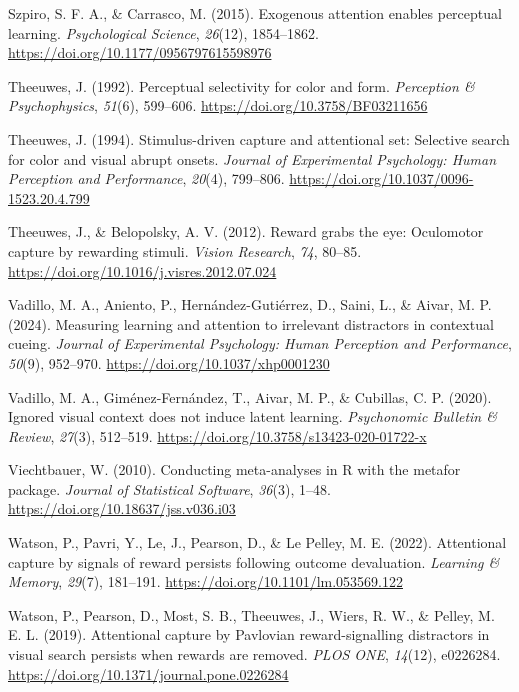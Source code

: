 \documentclass[
  man,
  floatsintext,
  longtable,
  nolmodern,
  notxfonts,
  notimes,
  mask,
  colorlinks=true,linkcolor=blue,citecolor=blue,urlcolor=blue]{apa7}
\newlength{\cslhangindent}
\newenvironment{CSLReferences}[2] %
 {\begin{list}{}{%
  \setlength{\itemindent}{0pt}
  \setlength{\leftmargin}{0pt}
  \setlength{\parsep}{0pt}
  \ifodd #1
   \setlength{\leftmargin}{\cslhangindent}
   \setlength{\itemindent}{-1\cslhangindent}
  \fi
  \setlength{\itemsep}{#2\baselineskip}}}
 {\end{list}}
\begin{document}
\begin{CSLReferences}{1}{0}
Szpiro, S. F. A., \& Carrasco, M. (2015). Exogenous attention enables
perceptual learning. \emph{Psychological Science}, \emph{26}(12),
1854--1862. \url{https://doi.org/10.1177/0956797615598976}

Theeuwes, J. (1992). Perceptual selectivity for color and form.
\emph{Perception \& Psychophysics}, \emph{51}(6), 599--606.
\url{https://doi.org/10.3758/BF03211656}

Theeuwes, J. (1994). Stimulus-driven capture and attentional set:
Selective search for color and visual abrupt onsets. \emph{Journal of
Experimental Psychology: Human Perception and Performance},
\emph{20}(4), 799--806. \url{https://doi.org/10.1037/0096-1523.20.4.799}

Theeuwes, J., \& Belopolsky, A. V. (2012). Reward grabs the eye:
Oculomotor capture by rewarding stimuli. \emph{Vision Research},
\emph{74}, 80--85. \url{https://doi.org/10.1016/j.visres.2012.07.024}

Vadillo, M. A., Aniento, P., Hernández-Gutiérrez, D., Saini, L., \&
Aivar, M. P. (2024). Measuring learning and attention to irrelevant
distractors in contextual cueing. \emph{Journal of Experimental
Psychology: Human Perception and Performance}, \emph{50}(9), 952--970.
\url{https://doi.org/10.1037/xhp0001230}

Vadillo, M. A., Giménez-Fernández, T., Aivar, M. P., \& Cubillas, C. P.
(2020). Ignored visual context does not induce latent learning.
\emph{Psychonomic Bulletin \& Review}, \emph{27}(3), 512--519.
\url{https://doi.org/10.3758/s13423-020-01722-x}

Viechtbauer, W. (2010). Conducting meta-analyses in {R} with the
{metafor} package. \emph{Journal of Statistical Software}, \emph{36}(3),
1--48. \url{https://doi.org/10.18637/jss.v036.i03}

Watson, P., Pavri, Y., Le, J., Pearson, D., \& Le Pelley, M. E. (2022).
Attentional capture by signals of reward persists following outcome
devaluation. \emph{Learning \& Memory}, \emph{29}(7), 181--191.
\url{https://doi.org/10.1101/lm.053569.122}

Watson, P., Pearson, D., Most, S. B., Theeuwes, J., Wiers, R. W., \&
Pelley, M. E. L. (2019). Attentional capture by Pavlovian
reward-signalling distractors in visual search persists when rewards are
removed. \emph{PLOS ONE}, \emph{14}(12), e0226284.
\url{https://doi.org/10.1371/journal.pone.0226284}


\end{CSLReferences}
\end{document}
